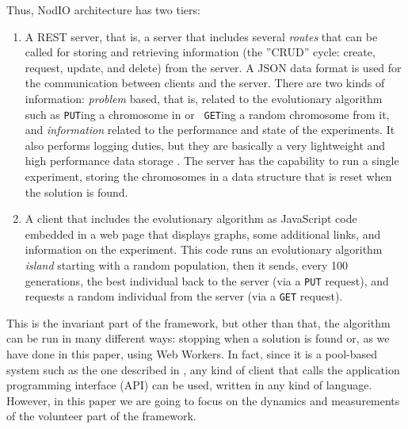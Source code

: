 \documentclass[journal,onecolumn]{IEEEtran}
\begin{document}


Thus, {\sf NodIO} architecture has two tiers:\begin{enumerate}
\item A REST server, that is, a server that includes several {\em
  routes} 
  that can be called for storing and retrieving information (the ''CRUD'' cycle:
  create, request, update, and delete) from the server. 
  A JSON data format is used for the communication between 
  clients and the server. There are two kinds of information:
  {\em problem} based, that is, related to the
  evolutionary algorithm such as {\tt PUT}ing a chromosome in or {\tt
  GET}ing a random chromosome from it, and {\em information} related
  to the performance and state of the experiments. It also performs logging
  duties, but they are basically a very lightweight and high performance
  data storage \cite{jj:idc:lowcost}.
  The server has the capability to
  run a single experiment, storing the chromosomes in a data structure
  that is reset when the solution is found.
\item A client that includes the evolutionary algorithm as
  JavaScript code embedded in a web page that displays graphs, some
  additional links, and information on the experiment. This code runs
  an evolutionary algorithm {\em island} starting with a random
  population, then it sends, every 100 generations, the best individual
  back to the server (via a {\tt PUT} request), and requests a random
  individual from the server (via a {\tt GET} request). %
\end{enumerate}


  This is the invariant part of the framework, but other than that,
  the algorithm can be run in many different ways: 
  stopping when a solution is found or, as we have done in this paper,
  using Web Workers. In fact, since it is a pool-based system such as
  the one described in \cite{LNCS86720702}, any kind of client that
  calls the application programming interface (API) can be used, %
  written in any kind of language. However, in this paper we are going
  to focus on the dynamics and measurements of the volunteer part of
  the framework. 
\end{document}
